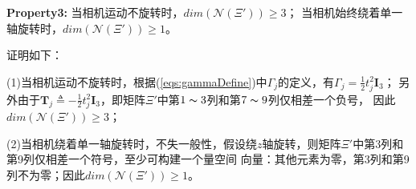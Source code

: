 \documentclass{article}
\begin{document}
\par
\textbf{Property3: }当相机运动不旋转时，$dim(\mathcal{N}(\Xi'))\geqslant 3$；
当相机始终绕着单一轴旋转时，$dim(\mathcal{N}(\Xi'))\geqslant 1$。
\par
证明如下：
\par
(1)当相机运动不旋转时，根据(\ref{eqs:gammaDefine})中$\Gamma_j$的定义，有$\Gamma_j=\frac{1}{2}t_j^2\textbf{I}_3$；
另外由于$\textbf{T}_j\triangleq -\frac{1}{2}t_j^2\textbf{I}_3$，即矩阵$\Xi'$中第$1\thicksim 3$列和第$7\thicksim 9$列仅相差一个负号，
因此$dim(\mathcal{N}(\Xi'))\geqslant 3$；
\par
(2)当相机绕着单一轴旋转时，不失一般性，假设绕$z$轴旋转，则矩阵$\Xi'$中第3列和第9列仅相差一个符号，至少可构建一个量空间
向量：其他元素为零，第3列和第9列不为零；因此$dim(\mathcal{N}(\Xi'))\geqslant 1$。
\end{document}
